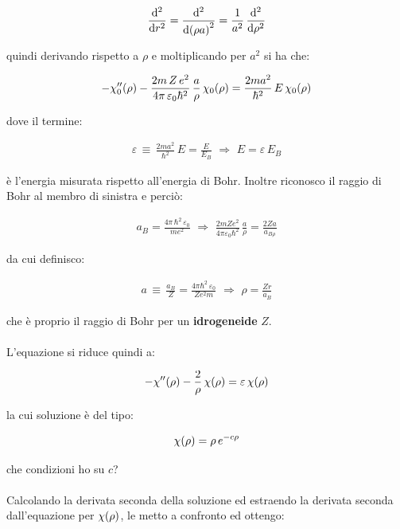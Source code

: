\begin{align*}
	\dv[2]{r} = \dv[2]{\qty(\rho a)} = \frac{1}{a^2} \, \dv[2]{\rho}
\end{align*}

	quindi derivando rispetto a $\rho$ e moltiplicando per $a^2$ si ha che:
	
\begin{align*}
	- \chi_{0}''\qty(\rho) - \frac{2m \, Z \, e^2}{4\pi \, \varepsilon_0 \hbar^2} \, \frac{a}{\rho} \, \chi_{0}\qty(\rho) = \frac{2ma^2}{\hbar^2} \, E \, \chi_{0}\qty(\rho)
\end{align*}

	dove il termine:
	
\begin{align*}
	\varepsilon \, \equiv \, \frac{2ma^2}{\hbar^2} \, E = \frac{E}{E_B} \, \, \Rightarrow \, \, E = \varepsilon \, E_B
\end{align*}

	è l'energia misurata rispetto all'energia di Bohr. Inoltre riconosco il raggio di Bohr al membro di sinistra e perciò:
	
\begin{align*}
	a_B = \frac{4\pi \, \hbar^2 \, \varepsilon_0}{me^2} \, \, \Rightarrow \,\, \frac{2mZ e^2}{4\pi \varepsilon_0 \hbar^2} \, \frac{a}{\rho} = \frac{2Z a}{a_{B \rho}}
\end{align*}

	da cui definisco:
	
\begin{align*}
	a \, \equiv \, \frac{a_B}{Z} = \frac{4 \pi \hbar^2 \, \varepsilon_0}{Z e^2 m} \, \, \Rightarrow \, \, \rho = \frac{Z r}{a_B}
\end{align*}

	che è proprio il raggio di Bohr per un \textbf{idrogeneide} $Z$.
	\\
	\\
	L'equazione si riduce quindi a:
	
\begin{align*}
	- \chi''\qty(\rho) - \frac{2}{\rho} \, \chi\qty(\rho) = \varepsilon \, \chi\qty(\rho)
\end{align*}
	
	la cui soluzione è del tipo:
	
\begin{align*}
	\chi\qty(\rho) = \rho \, e^{- c \rho}
\end{align*}

	che condizioni ho su $c$?
	\\
	\\
	Calcolando la derivata seconda della soluzione ed estraendo la derivata seconda dall'equazione per $\chi\qty(\rho)$, le metto a confronto ed ottengo:
	
